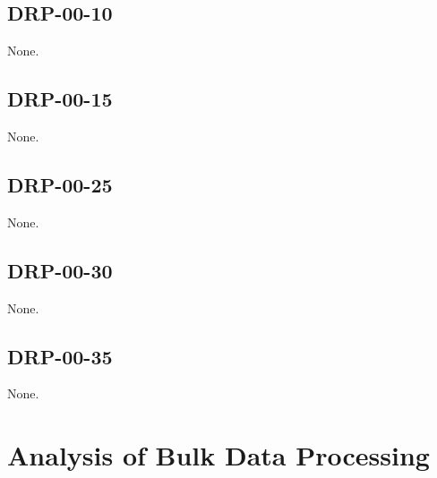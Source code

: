 \documentclass[DM,STR,toc]{lsstdoc}
\begin{document}
\subsection{DRP-00-10}

None.

\subsection{DRP-00-15}

None.

\subsection{DRP-00-25}

None.

\subsection{DRP-00-30}

None.

\subsection{DRP-00-35}

None.

\appendix

\newpage

\section{Analysis of Bulk Data Processing}




\end{document}
